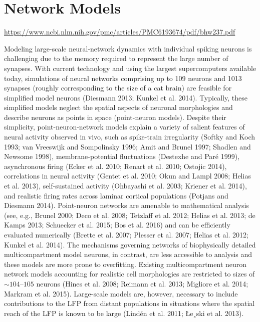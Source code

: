\section{Network Models}

\url{https://www.ncbi.nlm.nih.gov/pmc/articles/PMC6193674/pdf/bhw237.pdf}

Modeling large-scale neural-network dynamics with individual spiking neurons is challenging due to the memory required to represent the large number of synapses. With current technology and using the largest supercomputers available today, simulations of neural networks comprising up to 109 neurons and 1013 synapses (roughly corresponding to the size of a cat brain) are feasible for simplified model neurons (Diesmann 2013; Kunkel et al. 2014). Typically, these simplified models
neglect the spatial aspects of neuronal morphologies and describe neurons as points in space (point-neuron models).
Despite their simplicity, point-neuron-network models explain
a variety of salient features of neural activity observed in vivo,
such as spike-train irregularity (Softky and Koch 1993; van
Vreeswijk and Sompolinsky 1996; Amit and Brunel 1997;
Shadlen and Newsome 1998), membrane-potential fluctuations
(Destexhe and Paré 1999), asynchronous firing (Ecker et al. 2010;
Renart et al. 2010; Ostojic 2014), correlations in neural activity
(Gentet et al. 2010; Okun and Lampl 2008; Helias et al. 2013),
self-sustained activity (Ohbayashi et al. 2003; Kriener et al.
2014), and realistic firing rates across laminar cortical populations (Potjans and Diesmann 2014). Point-neuron networks are
amenable to mathematical analysis (see, e.g., Brunel 2000; Deco
et al. 2008; Tetzlaff et al. 2012; Helias et al. 2013; de Kamps
2013; Schuecker et al. 2015; Bos et al. 2016) and can be efficiently evaluated numerically (Brette et al. 2007; Plesser et al.
2007; Helias et al. 2012; Kunkel et al. 2014). The mechanisms
governing networks of biophysically detailed multicompartment model neurons, in contrast, are less accessible to analysis
and these models are more prone to overfitting. Existing multicompartment neuron network models accounting for realistic
cell morphologies are restricted to sizes of $\sim104
–105$ neurons
(Hines et al. 2008; Reimann et al. 2013; Migliore et al. 2014;
Markram et al. 2015). Large-scale models are, however, necessary to include contributions to the LFP from distant populations in situations where the spatial reach of the LFP is known
to be large (Lindén et al. 2011; Łe¸ski et al. 2013). 

